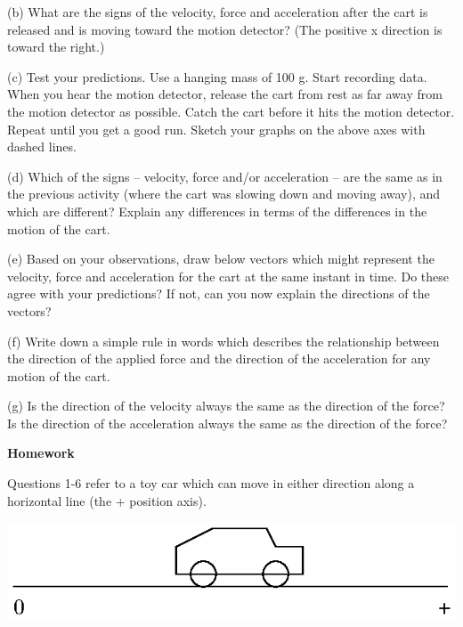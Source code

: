 (b) What are the signs of the velocity, force and acceleration after the cart
is released and is moving toward the motion detector? (The positive x direction
is toward the right.)
\vspace{20mm}

(c) Test your predictions. Use a hanging mass of 100 g. Start recording data.
When you hear the motion detector, release the cart from rest as far away from
the motion detector as possible. Catch the cart before it hits the motion detector.
Repeat until you get a good run. Sketch your graphs on the above axes with dashed
lines.

\pagebreak[2]
(d) Which of the signs -- velocity, force and/or acceleration -- are the same as
in the previous activity (where the cart was slowing down and moving away), and
which are different? Explain any differences in terms of the differences in
the motion of the cart.
\vspace{20mm}

(e) Based on your observations, draw below vectors which might represent the
velocity, force and acceleration for the cart at the same instant in time. Do
these agree with your predictions? If not, can you now explain the directions
of the vectors?
\vspace{30mm}

(f) Write down a simple rule in words which describes the relationship between
the direction of the applied force and the direction of the acceleration for
any motion of the cart.
\vspace{20mm}

(g) Is the direction of the velocity always the same as the direction of the
force? Is the direction of the acceleration always the same as the direction
of the force?
\vspace{20mm}

\textbf{Homework }

Questions 1-6 refer to a toy car which can move in either direction along a
horizontal line (the + position axis).

\vspace{0.3cm}
{\par\centering \includegraphics{force2/force2_fig6.eps} \par}
\vspace{0.3cm}

